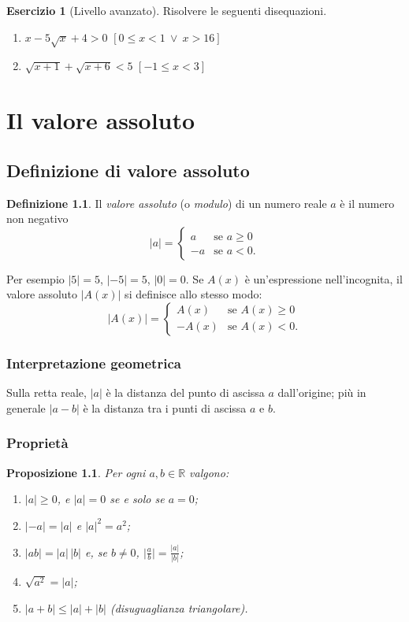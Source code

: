 \documentclass[12pt,a4paper,openany]{book}
\theoremstyle{definition}
\newtheorem{definizione}{Definizione}[section]
\newtheorem{esercizio}{Esercizio}[section]
\theoremstyle{plain}
\newtheorem{proposizione}[teorema]{Proposizione}
\theoremstyle{remark}
\newcommand{\R}{\mathbb{R}}
\newcommand{\abs}[1]{\left|#1\right|}
\begin{document}
\begin{esercizio}[Livello avanzato]
Risolvere le seguenti disequazioni.
\begin{enumerate}[label=\alph*)]
\item $x-5\sqrt{x}+4>0$ \hfill $[0\le x<1\ \lor\ x>16]$
\item $\sqrt{x+1}+\sqrt{x+6}<5$ \hfill $[-1\le x<3]$
\end{enumerate}
\end{esercizio}

\chapter{Il valore assoluto}

\section{Definizione di valore assoluto}

\begin{definizione}
Il \emph{valore assoluto} (o \emph{modulo}) di un numero reale $a$ è il numero non negativo
\[
\abs{a}=\begin{cases} a & \text{se } a\ge 0\\ -a & \text{se } a<0.\end{cases}
\]
\end{definizione}

Per esempio $\abs{5}=5$, $\abs{-5}=5$, $\abs{0}=0$. Se $A(x)$ è un'espressione nell'incognita, il valore assoluto $\abs{A(x)}$ si definisce allo stesso modo:
\[
\abs{A(x)}=\begin{cases} A(x) & \text{se } A(x)\ge 0\\ -A(x) & \text{se } A(x)<0.\end{cases}
\]

\subsection*{Interpretazione geometrica}

Sulla retta reale, $\abs{a}$ è la distanza del punto di ascissa $a$ dall'origine; più in generale $\abs{a-b}$ è la distanza tra i punti di ascissa $a$ e $b$.

\subsection*{Proprietà}

\begin{proposizione}
Per ogni $a,b\in\R$ valgono:
\begin{enumerate}[label=\arabic*)]
\item $\abs{a}\ge 0$, e $\abs{a}=0$ se e solo se $a=0$;
\item $\abs{-a}=\abs{a}$ e $\abs{a}^2=a^2$;
\item $\abs{ab}=\abs{a}\,\abs{b}$ e, se $b\neq 0$, $\bigl|\tfrac ab\bigr|=\tfrac{\abs{a}}{\abs{b}}$;
\item $\sqrt{a^2}=\abs{a}$;
\item $\abs{a+b}\le\abs{a}+\abs{b}$ (disuguaglianza triangolare).
\end{enumerate}
\end{proposizione}
\end{document}
